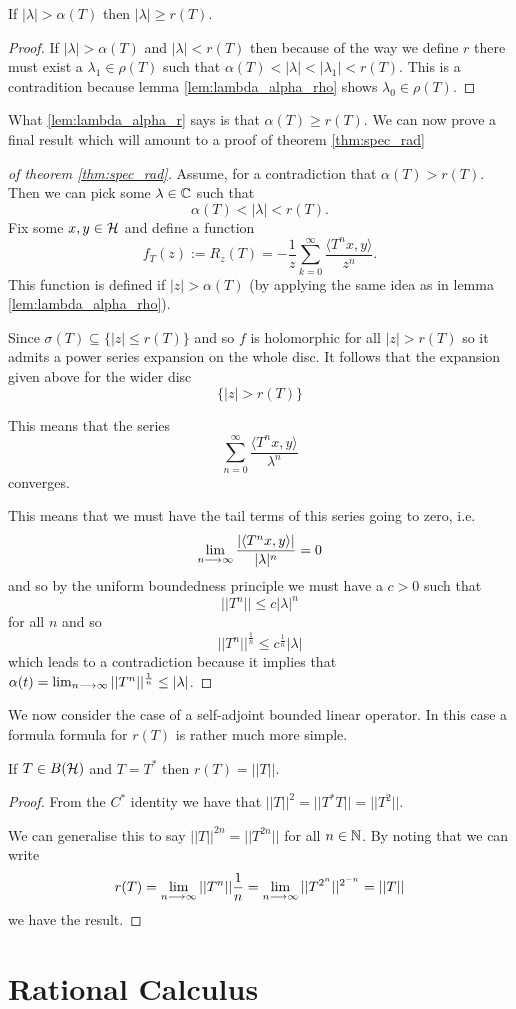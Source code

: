 \documentclass{unswmaths}
\begin{document}
\begin{lemma}
	\label{lem:lambda_alpha_r}
	If $ |\lambda| > \alpha(T) $ then $ |\lambda| \geq r(T) $.
\end{lemma}
\begin{proof}
	If $ |\lambda| > \alpha(T) $ and $ |\lambda| < r(T) $ then because of the way we define $ r $ there must exist a $ \lambda_1 \in \rho(T) $ such that
	$ \alpha(T) < |\lambda| < |\lambda_1| < r(T) $. This is a contradition because lemma \ref{lem:lambda_alpha_rho} shows
	$ \lambda_0 \in \rho(T) $.
\end{proof}

What \ref{lem:lambda_alpha_r} says is that $ \alpha(T) \geq r(T) $.
We can now prove a final result which will amount to a proof of theorem \ref{thm:spec_rad}

\begin{proof}[of theorem \ref{thm:spec_rad}]
Assume, for a contradiction that $ \alpha(T) > r(T) $. Then we can pick some $ \lambda \in \mathbb{C} $ such that 
$$
	\alpha(T) < |\lambda| < r(T).
$$
Fix some $ x, y \in \mathcal{H} $ and define a function
$$
	f_T(z) := R_z(T) = -\frac{1}{z} \sum_{k=0}^\infty \frac{\langle T^n x, y \rangle}{z^n}.
$$
This function is defined if $ |z| > \alpha(T) $ (by applying the same idea as in lemma \ref{lem:lambda_alpha_rho}).

Since $ \sigma(T) \subseteq \{ |z| \leq r(T) \} $ and so $ f $ is holomorphic for all $ |z| > r(T) $ so
it admits a power series expansion on the whole disc. It follows that the expansion given above for the wider disc
$$ \{ |z| > r(T) \} $$

This means that the series 
$$
	\sum_{n=0}^\infty \frac{\langle T^n x, y \rangle}{\lambda^n}
$$
converges.

This means that we must have the tail terms of this series going to zero, i.e.
$$
	\lim_{n \longrightarrow \infty} \frac{|\langle T^n x, y \rangle|}{|\lambda|^n} = 0
$$
and so by the uniform boundedness principle we must have a $ c > 0 $ such that
$$
	||T^n|| \leq c|\lambda|^n
$$
for all $ n $ and so
$$
	||T^n||^\frac{1}{n} \leq c^\frac{1}{n} |\lambda|
$$
which leads to a contradiction because it implies that $ \alpha(t) = \lim_{n \longrightarrow \infty} ||T^n||^\frac{1}{n} \leq |\lambda| $.
\end{proof}

We now consider the case of a self-adjoint bounded linear operator. In this case a formula formula for $ r(T) $
is rather much more simple.
\begin{lemma}
	If $ T \in B(\mathcal{H}) $ and $ T = T^* $ then $ r(T) = ||T|| $.
\end{lemma}
\begin{proof}
	From the $C^*$ identity we have that $ ||T||^2 = ||T^*T|| = ||T^2|| $.
	
	We can generalise this to say $ ||T||^{2n} = ||T^{2n}|| $ for all $ n \in \mathbb{N} $.
	By noting that we can write
	$$
		r(T) = \lim_{n \longrightarrow \infty} ||T^n||\frac{1}{n} = \lim_{n \longrightarrow \infty}||T^{2^n}||^{2^{-n}} = ||T||
	$$
	we have the result.
\end{proof}

\section*{Rational Calculus}
\end{document}
